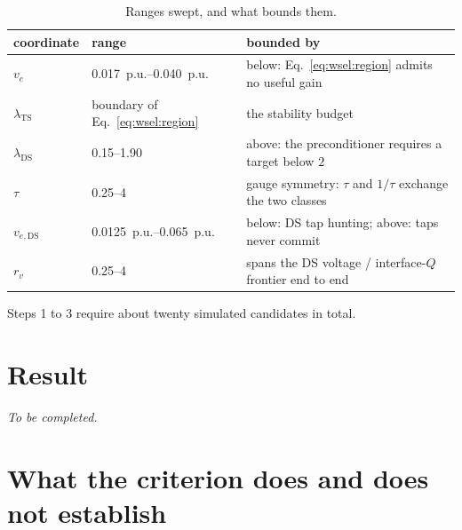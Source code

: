 \documentclass[11pt,a4paper]{article}
\newcommand{\pu}{\ensuremath{\mathrm{p.u.}}}
\newcommand{\lamts}{\ensuremath{\lambda_{\mathrm{TS}}}}
\newcommand{\lamds}{\ensuremath{\lambda_{\mathrm{DS}}}}
\begin{document}
\begin{table}[htbp]
  \centering
  \caption{Ranges swept, and what bounds them.}
  \label{tab:wsel:ranges}
  \begin{tabular}{lll}
    \toprule
    coordinate & range & bounded by \\
    \midrule
    $v_e$ & \SIrange{0.017}{0.040}{\pu} & below: Eq.~\eqref{eq:wsel:region} admits no useful gain \\
    \lamts & boundary of Eq.~\eqref{eq:wsel:region} & the stability budget \\
    \lamds & \numrange{0.15}{1.90} & above: the preconditioner requires a target below $2$ \\
    $\tau$ & \numrange{0.25}{4} & gauge symmetry: $\tau$ and $1/\tau$ exchange the two classes \\
    $v_{e,\mathrm{DS}}$ & \SIrange{0.0125}{0.065}{\pu} & below: DS tap hunting; above: taps never commit \\
    $r_v$ & \numrange{0.25}{4} & spans the DS voltage / interface-$Q$ frontier end to end \\
    \bottomrule
  \end{tabular}
\end{table}

Steps 1 to 3 require about twenty simulated candidates in total.

\section{Result}
\label{sec:wsel:result}


\emph{To be completed.}

\section{What the criterion does and does not establish}
\label{sec:wsel:limits}
\end{document}
